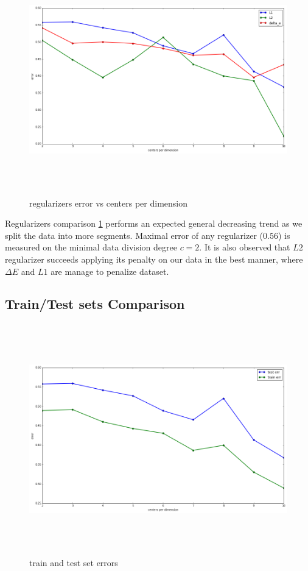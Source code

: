 \begin{figure}[H] 
	\includegraphics[width=\linewidth,height=10cm,keepaspectratio]{Figures/regs}
	\caption[regs]
	{regularizers error vs centers per dimension}
	\label{regularizers error vs centers per dimension}
\end{figure}

Regularizers comparison \ref{regularizers error vs centers per dimension} performs an expected general decreasing trend as we split the data into more segments.
Maximal error of any regularizer ($0.56$) is measured on the minimal data division degree $c=2$. It is also observed that $L2$ regularizer succeeds applying its penalty on our data in the best manner, where $\Delta E$ and $ L1$ are manage to penalize dataset.


\subsection{Train/Test sets Comparison}

\begin{figure}[H] 
	\includegraphics[width=\linewidth,height=10cm,keepaspectratio]{Figures/train_test}
	\caption[train and test set errors]
	{train and test set errors}
	\label{train and test set errors}
\end{figure}

